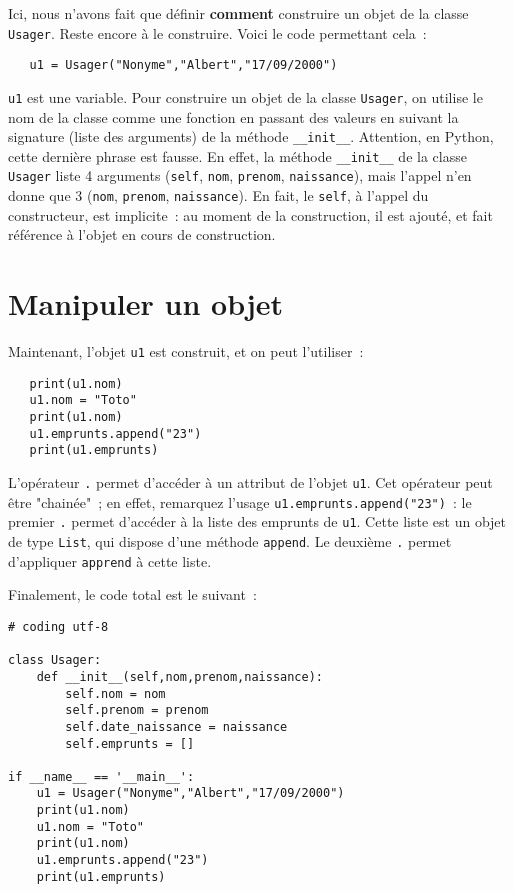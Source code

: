 \documentclass{article}
\begin{document}
Ici, nous n'avons fait que définir \textbf{comment} construire un objet de la classe \texttt{Usager}. Reste encore à le construire. Voici le code permettant cela~:

\begin{verbatim}
   u1 = Usager("Nonyme","Albert","17/09/2000")
\end{verbatim} 

\texttt{u1} est une variable. Pour construire un objet de la classe \texttt{Usager}, on utilise le nom de la classe comme une fonction en passant des valeurs en suivant la signature (liste des arguments) de la méthode \texttt{\_\_init\_\_}. Attention, en Python, cette dernière phrase est fausse. En effet, la méthode \texttt{\_\_init\_\_} de la classe \texttt{Usager} liste 4 arguments (\texttt{self}, \texttt{nom}, \texttt{prenom}, \texttt{naissance}), mais l'appel n'en donne que 3 (\texttt{nom}, \texttt{prenom}, \texttt{naissance}). En fait, le \texttt{self}, à l'appel du constructeur, est implicite~: au moment de la construction, il est ajouté, et fait référence à l'objet en cours de construction.


\section{Manipuler un objet}

Maintenant, l'objet \texttt{u1} est construit, et on peut l'utiliser~:

\begin{verbatim}
   print(u1.nom)
   u1.nom = "Toto"
   print(u1.nom)
   u1.emprunts.append("23")
   print(u1.emprunts)
\end{verbatim}

L'opérateur \texttt{.} permet d'accéder à un attribut de l'objet \texttt{u1}. Cet opérateur peut être "chainée"~; en effet, remarquez l'usage  \texttt{u1.emprunts.append("23")}~: le premier \texttt{.} permet d'accéder à la liste des emprunts de \texttt{u1}. Cette liste est un objet de type \texttt{List}, qui dispose d'une méthode \texttt{append}. Le deuxième \texttt{.} permet d'appliquer \texttt{apprend} à cette liste. 

Finalement, le code total est le suivant~:


\begin{verbatim}
# coding utf-8

class Usager:
    def __init__(self,nom,prenom,naissance):
        self.nom = nom
        self.prenom = prenom
        self.date_naissance = naissance
        self.emprunts = []

if __name__ == '__main__':
    u1 = Usager("Nonyme","Albert","17/09/2000")
    print(u1.nom)
    u1.nom = "Toto"
    print(u1.nom)
    u1.emprunts.append("23")
    print(u1.emprunts)
\end{verbatim} 
\end{document}
